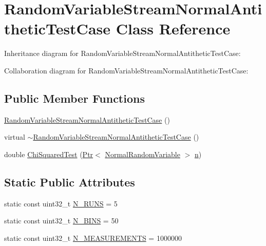 \hypertarget{classRandomVariableStreamNormalAntitheticTestCase}{}\section{Random\+Variable\+Stream\+Normal\+Antithetic\+Test\+Case Class Reference}
\label{classRandomVariableStreamNormalAntitheticTestCase}


Inheritance diagram for Random\+Variable\+Stream\+Normal\+Antithetic\+Test\+Case\+:


Collaboration diagram for Random\+Variable\+Stream\+Normal\+Antithetic\+Test\+Case\+:
\subsection*{Public Member Functions}
\begin{DoxyCompactItemize}
\item 
\hyperlink{classRandomVariableStreamNormalAntitheticTestCase_a8662ce0858cefe1e7b34b0aa6b109056}{Random\+Variable\+Stream\+Normal\+Antithetic\+Test\+Case} ()
\item 
virtual \hyperlink{classRandomVariableStreamNormalAntitheticTestCase_a3a084610547debabbb332927d7f74ed0}{$\sim$\+Random\+Variable\+Stream\+Normal\+Antithetic\+Test\+Case} ()
\item 
double \hyperlink{classRandomVariableStreamNormalAntitheticTestCase_a685f62e02fc09e39ff03e6bf82b1bad3}{Chi\+Squared\+Test} (\hyperlink{classns3_1_1Ptr}{Ptr}$<$ \hyperlink{classns3_1_1NormalRandomVariable}{Normal\+Random\+Variable} $>$ \hyperlink{lte__link__budget__x2__handover__measures_8m_abdb05bc5a064cf642a06c83b3392f148}{n})
\end{DoxyCompactItemize}
\subsection*{Static Public Attributes}
\begin{DoxyCompactItemize}
\item 
static const uint32\+\_\+t \hyperlink{classRandomVariableStreamNormalAntitheticTestCase_aad75ff2556c09a7dfb5e08546b25fac4}{N\+\_\+\+R\+U\+NS} = 5
\item 
static const uint32\+\_\+t \hyperlink{classRandomVariableStreamNormalAntitheticTestCase_a8e535b2fdb6a3f59c0abc6b61998a657}{N\+\_\+\+B\+I\+NS} = 50
\item 
static const uint32\+\_\+t \hyperlink{classRandomVariableStreamNormalAntitheticTestCase_a2af883acc639d6f19843c57a174c0349}{N\+\_\+\+M\+E\+A\+S\+U\+R\+E\+M\+E\+N\+TS} = 1000000
\end{DoxyCompactItemize}

